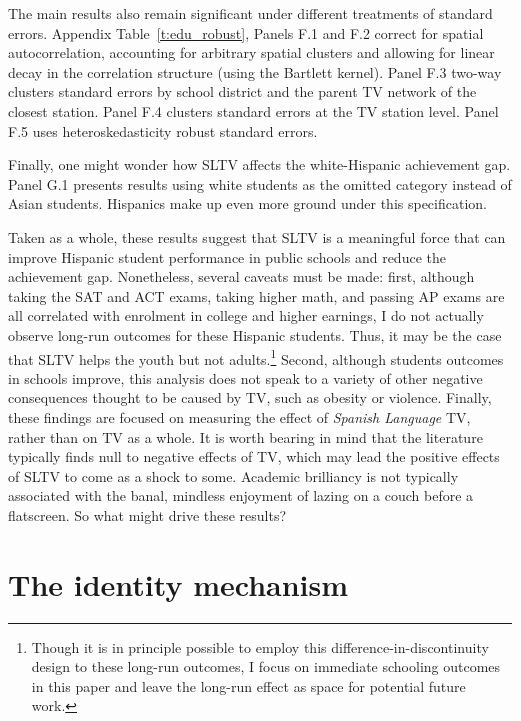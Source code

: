 \documentclass[11pt]{article}
\begin{document}
The main results also remain significant under different treatments of standard errors. Appendix Table~\ref{t:edu_robust}, Panels F.1 and F.2 correct for spatial autocorrelation, accounting for arbitrary spatial clusters and allowing for linear decay in the correlation structure (using the Bartlett kernel). Panel F.3 two-way clusters standard errors by school district and the parent TV network of the closest station. Panel F.4 clusters standard errors at the TV station level. Panel F.5 uses heteroskedasticity robust standard errors.

Finally, one might wonder how SLTV affects the white-Hispanic achievement gap. Panel G.1 presents results using white students as the omitted category instead of Asian students. Hispanics make up even more ground under this specification.


Taken as a whole, these results suggest that SLTV is a meaningful force that can improve Hispanic student performance in public schools and reduce the achievement gap. Nonetheless, several caveats must be made: first, although taking the SAT and ACT exams, taking higher math, and passing AP exams are all correlated with enrolment in college and higher earnings, I do not actually observe long-run outcomes for these Hispanic students. Thus, it may be the case that SLTV helps the youth but not adults.\footnote{ Though it is in principle possible to employ this difference-in-discontinuity design to these long-run outcomes, I focus on immediate schooling outcomes in this paper and leave the long-run effect as space for potential future work.} Second, although students outcomes in schools improve, this analysis does not speak to a variety of other negative consequences thought to be caused by TV, such as obesity or violence. Finally, these findings are focused on measuring the effect of \textit{Spanish Language} TV, rather than on TV as a whole. It is worth bearing in mind that the literature typically finds null to negative effects of TV, which may lead the positive effects of SLTV to come as a shock to some. Academic brilliancy is not typically associated with the banal, mindless enjoyment of lazing on a couch before a flatscreen. So what might drive these results?



\section{The identity mechanism}\label{s:mech}
\end{document}
